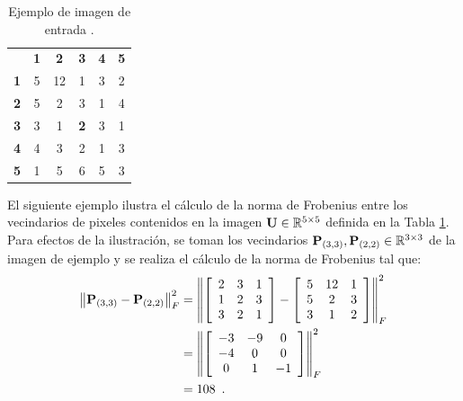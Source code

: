 \begin{table}[htb]
\begin{center}
\caption{Ejemplo de imagen de entrada .\label{table:imageExample}}

\renewcommand{\arraystretch}{1.4}
\setlength\tabcolsep{3pt}

{
\begin{tabular}{cc|ccc|c}
 & \multicolumn{1}{c}{\textbf{1}} & \textbf{2} & \textbf{3} & \multicolumn{1}{c}{\textbf{4}} & \textbf{5}\tabularnewline
\textbf{1} & \multicolumn{1}{c}{5} & 12 & 1 & \multicolumn{1}{c}{3} & 2\tabularnewline
\cline{3-5} 
\textbf{2} & 5 & 2 & 3 & 1 & 4\tabularnewline
\textbf{3} & 3 & 1 & \textbf{2} & 3 & 1\tabularnewline
\textbf{4} & 4 & 3 & 2 & 1 & 3\tabularnewline
\cline{3-5} 
\textbf{5} & \multicolumn{1}{c}{1} & 5 & 6 & \multicolumn{1}{c}{5} & 3\tabularnewline
\end{tabular}
}
\par\end{center} 
\end{table}

El siguiente ejemplo ilustra el cálculo de la norma de Frobenius entre los vecindarios de pixeles contenidos en la imagen $\mathbf{U} \in\mathbb{R}^{5 \times 5}$ definida en la Tabla \ref{table:imageExample}. Para efectos de la ilustración, se toman los vecindarios $\mathbf{P}_{\left(3,3\right)},\mathbf{P}_{\left(2,2\right)} \in\mathbb{R}^{3\times3}$ de la imagen de ejemplo   y se realiza  el cálculo de la norma de Frobenius tal que:
%
\begin{equation}
\label{eq:resultado1}
\begin{split}
\left\Vert \mathbf{P}_{\left(3,3\right)}-\mathbf{P}_{\left(2,2\right)}\right\Vert_{F} ^{2} & =\left\Vert \left[\begin{array}{ccc}
2 & 3 & 1\\
1 & 2 & 3\\
3 & 2 & 1
\end{array} \right]-\left[\begin{array}{ccc}
5 & 12 & 1\\
5 & 2 & 3\\
3 & 1 & 2
\end{array}\right]\right\Vert_{F}^2 \\
& =\left\Vert\left[\begin{array}{ccc}
-3 & -9 & 0\\
-4 & 0 & 0\\
0 & 1 & -1
\end{array}\right]\right\Vert_{F}^2 \\
& =108 \enspace .
\end{split}
\end{equation}

